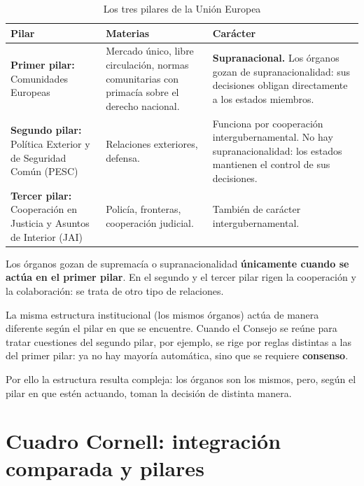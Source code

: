 \documentclass[12pt,oneside]{book}
\begin{document}
\begin{table}[H]
\centering
\caption{Los tres pilares de la Unión Europea}
\small
\begin{tabularx}{\textwidth}{@{}P{3.4cm}YY@{}}
\toprule
\textbf{Pilar} & \textbf{Materias} & \textbf{Carácter} \\
\midrule
\textbf{Primer pilar:} Comunidades Europeas
& Mercado único, libre circulación, normas comunitarias con primacía sobre el derecho nacional.
& \textbf{Supranacional.} Los órganos gozan de supranacionalidad: sus decisiones obligan directamente a los estados miembros. \\
\addlinespace
\textbf{Segundo pilar:} Política Exterior y de Seguridad Común (PESC)
& Relaciones exteriores, defensa.
& Funciona por cooperación intergubernamental. No hay supranacionalidad: los estados mantienen el control de sus decisiones. \\
\addlinespace
\textbf{Tercer pilar:} Cooperación en Justicia y Asuntos de Interior (JAI)
& Policía, fronteras, cooperación judicial.
& También de carácter intergubernamental. \\
\bottomrule
\end{tabularx}
\end{table}

\begin{important}
Los órganos gozan de supremacía o supranacionalidad \textbf{únicamente cuando se actúa en el primer pilar}. En el segundo y el tercer pilar rigen la cooperación y la colaboración: se trata de otro tipo de relaciones.
\end{important}

La misma estructura institucional (los mismos órganos) actúa de manera diferente según el pilar en que se encuentre. Cuando el Consejo se reúne para tratar cuestiones del segundo pilar, por ejemplo, se rige por reglas distintas a las del primer pilar: ya no hay mayoría automática, sino que se requiere \textbf{consenso}.

Por ello la estructura resulta compleja: los órganos son los mismos, pero, según el pilar en que estén actuando, toman la decisión de distinta manera.

\section{Cuadro Cornell: integración comparada y pilares}
\end{document}
